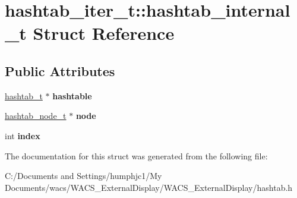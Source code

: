 \hypertarget{structhashtab__iter__t_1_1hashtab__internal__t}{
\section{hashtab\_\-iter\_\-t::hashtab\_\-internal\_\-t Struct Reference}
\label{structhashtab__iter__t_1_1hashtab__internal__t}
}
\subsection*{Public Attributes}
\begin{DoxyCompactItemize}
\item 
\hypertarget{structhashtab__iter__t_1_1hashtab__internal__t_a10f91e67745170bad4778c3821812f99}{
\hyperlink{structhashtab__t}{hashtab\_\-t} $\ast$ {\bfseries hashtable}}
\label{structhashtab__iter__t_1_1hashtab__internal__t_a10f91e67745170bad4778c3821812f99}

\item 
\hypertarget{structhashtab__iter__t_1_1hashtab__internal__t_aa3babf4ae40ad12fc79908fbf06a6600}{
\hyperlink{structhashtab__node__t}{hashtab\_\-node\_\-t} $\ast$ {\bfseries node}}
\label{structhashtab__iter__t_1_1hashtab__internal__t_aa3babf4ae40ad12fc79908fbf06a6600}

\item 
\hypertarget{structhashtab__iter__t_1_1hashtab__internal__t_a9a30a5c65308959ed03530699ec0a09d}{
int {\bfseries index}}
\label{structhashtab__iter__t_1_1hashtab__internal__t_a9a30a5c65308959ed03530699ec0a09d}

\end{DoxyCompactItemize}


The documentation for this struct was generated from the following file:\begin{DoxyCompactItemize}
\item 
C:/Documents and Settings/humphjc1/My Documents/wacs/WACS\_\-ExternalDisplay/WACS\_\-ExternalDisplay/hashtab.h\end{DoxyCompactItemize}
